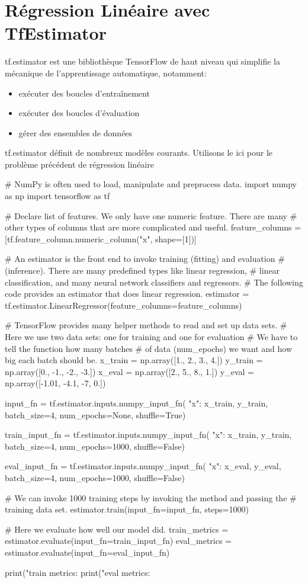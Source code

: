 \documentclass[a4paper,11pt]{book}
\theoremstyle{theo}
\begin{document}
\section{Régression Linéaire avec TfEstimator}

tf.estimator est une bibliothèque TensorFlow de haut niveau qui simplifie la mécanique de l'apprentissage automatique, notamment:
\begin{itemize}
\item exécuter des boucles d'entraînement
\item exécuter des boucles d'évaluation
\item gérer des ensembles de données
\end{itemize}

tf.estimator définit de nombreux modèles courants.
Utilisons le ici pour le problème précédent de régression linéaire
\begin{mypython}
# NumPy is often used to load, manipulate and preprocess data.
import numpy as np
import tensorflow as tf

# Declare list of features. We only have one numeric feature. There are many
# other types of columns that are more complicated and useful.
feature_columns = [tf.feature_column.numeric_column("x", shape=[1])]

# An estimator is the front end to invoke training (fitting) and evaluation
# (inference). There are many predefined types like linear regression,
# linear classification, and many neural network classifiers and regressors.
# The following code provides an estimator that does linear regression.
estimator = tf.estimator.LinearRegressor(feature_columns=feature_columns)

# TensorFlow provides many helper methods to read and set up data sets.
# Here we use two data sets: one for training and one for evaluation
# We have to tell the function how many batches
# of data (num_epochs) we want and how big each batch should be.
x_train = np.array([1., 2., 3., 4.])
y_train = np.array([0., -1., -2., -3.])
x_eval = np.array([2., 5., 8., 1.])
y_eval = np.array([-1.01, -4.1, -7, 0.])

input_fn = tf.estimator.inputs.numpy_input_fn(
    {"x": x_train}, y_train, batch_size=4, num_epochs=None, shuffle=True)

train_input_fn = tf.estimator.inputs.numpy_input_fn(
    {"x": x_train}, y_train, batch_size=4, num_epochs=1000, shuffle=False)

eval_input_fn = tf.estimator.inputs.numpy_input_fn(
    {"x": x_eval}, y_eval, batch_size=4, num_epochs=1000, shuffle=False)

# We can invoke 1000 training steps by invoking the  method and passing the
# training data set.
estimator.train(input_fn=input_fn, steps=1000)

# Here we evaluate how well our model did.
train_metrics = estimator.evaluate(input_fn=train_input_fn)
eval_metrics = estimator.evaluate(input_fn=eval_input_fn)

print("train metrics: %
print("eval metrics: %
\end{mypython}
\end{document}
